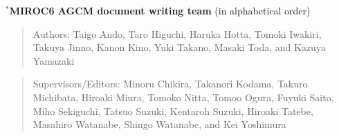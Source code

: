 $^*${\bf\textbf{MIROC6 AGCM document writing team}} (in alphabetical order)
\begin{quotation}
  Authors:
  Taigo Ando,
  Taro Higuchi,
  Haruka Hotta,
  Tomoki Iwakiri,
  Takuya Jinno,
  Kanon Kino,
  Yuki Takano,
  Masaki Toda,
  and
  Kazuya Yamazaki
\end{quotation}
\begin{quotation}
  Supervisors/Editors:
  Minoru Chikira,
  Takanori Kodama,
  Takuro Michibata,
  Hiroaki Miura,
  Tomoko Nitta,
  Tomoo Ogura,
  Fuyuki Saito,
  Miho Sekiguchi,
  Tatsuo
  Suzuki,
  Kentaroh Suzuki,
  Hiroaki Tatebe,
  Masahiro Watanabe,
  Shingo Watanabe,
  and
  Kei Yoshimura
\end{quotation}
